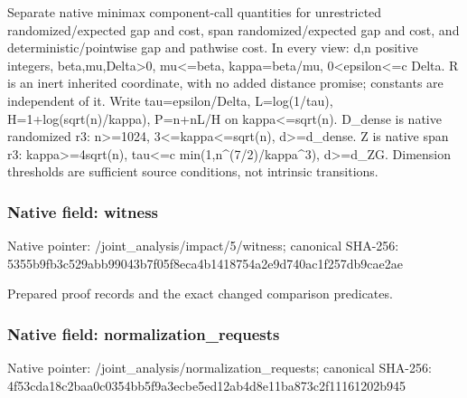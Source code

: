\documentclass[10pt,a4paper]{article}
\begin{document}
\begingroup\raggedright\sloppy Separate native minimax component-call quantities for unrestricted randomized/\allowbreak{}expected gap and cost,\allowbreak{} span randomized/\allowbreak{}expected gap and cost,\allowbreak{} and deterministic/\allowbreak{}pointwise gap and pathwise cost. In every view:\allowbreak{} d,\allowbreak{}n positive integers,\allowbreak{} beta,\allowbreak{}mu,\allowbreak{}Delta>0,\allowbreak{} mu<=\allowbreak{}beta,\allowbreak{} kappa=\allowbreak{}beta/\allowbreak{}mu,\allowbreak{} 0<epsilon<=\allowbreak{}c Delta. R is an inert inherited coordinate,\allowbreak{} with no added distance promise;\allowbreak{} constants are independent of it. Write tau=\allowbreak{}epsilon/\allowbreak{}Delta,\allowbreak{} L=\allowbreak{}log(1/\allowbreak{}tau),\allowbreak{} H=\allowbreak{}1+log(sqrt(n)/\allowbreak{}kappa),\allowbreak{} P=\allowbreak{}n+nL/\allowbreak{}H on kappa<=\allowbreak{}sqrt(n). D\_\allowbreak{}dense is native randomized r3:\allowbreak{} n>=\allowbreak{}1024,\allowbreak{} 3<=\allowbreak{}kappa<=\allowbreak{}sqrt(n),\allowbreak{} d>=\allowbreak{}d\_\allowbreak{}dense. Z is native span r3:\allowbreak{} kappa>=\allowbreak{}4sqrt(n),\allowbreak{} tau<=\allowbreak{}c min(1,\allowbreak{}n\textasciicircum{}(7/\allowbreak{}2)/\allowbreak{}kappa\textasciicircum{}3),\allowbreak{} d>=\allowbreak{}d\_\allowbreak{}ZG. Dimension thresholds are sufficient source conditions,\allowbreak{} not intrinsic transitions.\par\endgroup

\subsubsection{Native field: witness}
Native pointer: /joint\_\allowbreak{}analysis/impact/5/witness; canonical SHA-256: 5355b9fb3c529abb99043b7f05f8eca4b1418754a2e9d740ac1f257db9cae2ae

\begingroup\raggedright\sloppy Prepared proof records and the exact changed comparison predicates.\par\endgroup

\subsubsection{Native field: normalization\_\allowbreak{}requests}
Native pointer: /joint\_\allowbreak{}analysis/normalization\_\allowbreak{}requests; canonical SHA-256: 4f53cda18c2baa0c0354bb5f9a3ecbe5ed12ab4d8e11ba873c2f11161202b945
\end{document}
